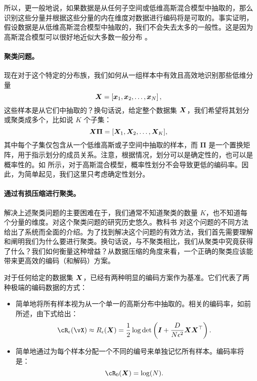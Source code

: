 \documentclass[../../book-main.tex]{subfiles}
\begin{document}
所以，更一般地说，如果数据是从任何子空间或低维高斯混合模型中抽取的，那么识别这些分量并根据这些分量的内在维度对数据进行编码将是可取的。事实证明，假设数据是从低维高斯混合模型中抽取的，我们不会失去太多的一般性。这是因为高斯混合模型可以很好地近似大多数一般分布 \cite{borkar2016gaussian}。

\paragraph{聚类问题。}
现在对于这个特定的分布族，我们如何从一组样本中有效且高效地识别那些低维分量
\begin{equation}
	\bm{X} = \left[\bm{x}_1, \bm{x}_2, \ldots, \bm{x}_N\right],
\end{equation}
这些样本是从它们中抽取的？换句话说，给定整个数据集 $\bm{X}$，我们希望将其划分或聚类成多个，比如说 $K$ 个子集：
\begin{equation}
	\bm{X}\bm \Pi = [\bm{X}_1, \bm{X}_2, \dots, \bm{X}_K],
\end{equation}
其中每个子集仅包含从一个低维高斯或子空间中抽取的样本，而 $\bm \Pi$ 是一个置换矩阵，用于指示划分的成员关系。注意，根据情况，划分可以是确定性的，也可以是概率性的。如 \cite{ma2007segmentation} 所示，对于高斯混合模型，概率性划分不会导致更低的编码率。因此，为简单起见，我们这里只考虑确定性划分。

\paragraph{通过有损压缩进行聚类。}
解决上述聚类问题的主要困难在于，我们通常不知道聚类的数量 $K$，也不知道每个分量的维度。对这个聚类问题的研究历史悠久。教科书 \cite{GPCA} 对这个问题的不同方法给出了系统而全面的介绍。为了找到解决这个问题的有效方法，我们首先需要理解和阐明我们为什么要进行聚类。换句话说，与不聚类相比，我们从聚类中究竟获得了什么？我们如何衡量这种增益？从数据压缩的角度来看，一个正确的聚类应该能带来更高效的编码（和解码）方案。

对于任何给定的数据集 $\bm{X}$，已经有两种明显的编码方案作为基准。它们代表了两种极端的编码数据的方式：
\begin{itemize}
	\item 简单地将所有样本视为从一个单一的高斯分布中抽取的。相关的编码率，如前所述，由下式给出：
	      \begin{equation}
		      \cR_{\epsilon}(\vX) \approx R_{\epsilon}(\X) = \frac{1}{2} \log \det \left(\boldsymbol{I} + \frac{D}{N\epsilon^2} \X\X^\top \right).
	      \end{equation}
	\item 简单地通过为每个样本分配一个不同的编号来单独记忆所有样本。编码率将是：
	      \begin{equation}
		      \cR_0(\X) = \log(N).
	      \end{equation}
\end{itemize}
\end{document}
